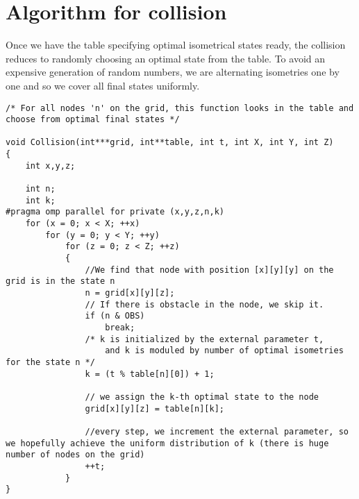 %
%
%
%
%
%
%
%
%
%
%
%
%	
%

\section{Algorithm for collision}
Once we have the table specifying optimal isometrical states ready, the collision reduces to randomly choosing an optimal state from the table. To avoid an expensive generation of random numbers, we are alternating isometries one by one and so we cover all final states uniformly.

\begin{lstlisting}
/* For all nodes 'n' on the grid, this function looks in the table and choose from optimal final states */

void Collision(int***grid, int**table, int t, int X, int Y, int Z)
{
	int x,y,z;

	int n;
	int k;
#pragma omp parallel for private (x,y,z,n,k)
	for (x = 0; x < X; ++x)
		for (y = 0; y < Y; ++y)
			for (z = 0; z < Z; ++z)
			{
				//We find that node with position [x][y][y] on the grid is in the state n 
				n = grid[x][y][z];
				// If there is obstacle in the node, we skip it.
				if (n & OBS)
					break;
				/* k is initialized by the external parameter t,
				    and k is moduled by number of optimal isometries for the state n */
				k = (t % table[n][0]) + 1;
				
				// we assign the k-th optimal state to the node 
				grid[x][y][z] = table[n][k];
				
				//every step, we increment the external parameter, so we hopefully achieve the uniform distribution of k (there is huge number of nodes on the grid)
				++t;
			}
}
\end{lstlisting}

